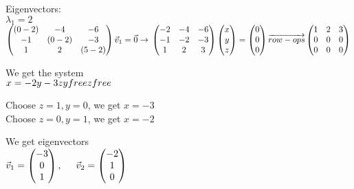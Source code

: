 \documentclass{article}
\begin{document}
Eigenvectors:\\
$\lambda_{1} = 2$\\
$
\left (
    \begin{matrix}
        (0 - 2) & -4 & -6\\
        -1 & (0-2) & -3\\
        1 & 2 & (5-2)
    \end{matrix}
\right )
\vec{v}_{1}=\vec{0} \rightarrow \\
\left (
    \begin{matrix}
        -2 & -4 & -6\\
        -1 & -2 & -3\\
        1 & 2 & 3
    \end{matrix}
\right )
\left (
    \begin{matrix}
        x\\
        y\\
        z
    \end{matrix}
\right )
=
\left (
    \begin{matrix}
        0\\
        0\\
        0
    \end{matrix}
\right )
\overrightarrow{row-ops}\\
\left (
    \begin{matrix}
        1 & 2 & 3\\
        0 & 0 & 0\\
        0 & 0 & 0
    \end{matrix}
\right )
$

We get the system\\
$
x = -2y - 3z\\
y free\\
z free
$

Choose $z=1, y=0$, we get $x=-3$\\
Choose $z=0, y=1$, we get $x=-2$

We get eigenvectors\\
$
\vec{v}_{1} = 
\left (
    \begin{matrix}
        -3\\
        0\\
        1
    \end{matrix}
\right ) , \hspace{5 mm}
\vec{v}_{2} =
\left (
    \begin{matrix}
        -2\\
        1\\
        0
    \end{matrix}
\right )
$
\end{document}
